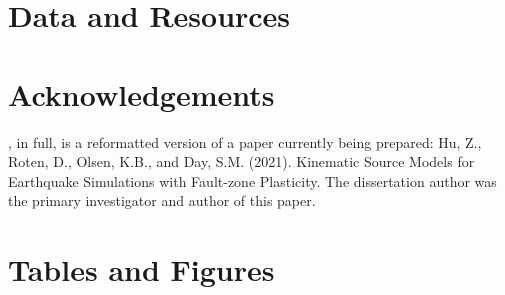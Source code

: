 \section*{Data and Resources}


\section*{Acknowledgements}

, in full, is a reformatted version of a paper currently being prepared: Hu, Z., Roten, D., Olsen, K.B., and Day, S.M. (2021). Kinematic Source Models for Earthquake Simulations with Fault-zone Plasticity. The dissertation author was the primary investigator and author of this paper.


\newpage
\section*{Tables and Figures}
%





